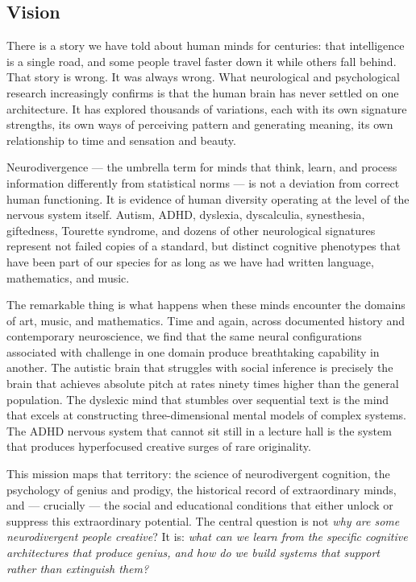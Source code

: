 \documentclass[11pt,letterpaper]{article}
\begin{document}
\subsection{Vision}

There is a story we have told about human minds for centuries: that intelligence is a single road, and some people travel faster down it while others fall behind. That story is wrong. It was always wrong. What neurological and psychological research increasingly confirms is that the human brain has never settled on one architecture. It has explored thousands of variations, each with its own signature strengths, its own ways of perceiving pattern and generating meaning, its own relationship to time and sensation and beauty.

Neurodivergence — the umbrella term for minds that think, learn, and process information differently from statistical norms — is not a deviation from correct human functioning. It is evidence of human diversity operating at the level of the nervous system itself. Autism, ADHD, dyslexia, dyscalculia, synesthesia, giftedness, Tourette syndrome, and dozens of other neurological signatures represent not failed copies of a standard, but distinct cognitive phenotypes that have been part of our species for as long as we have had written language, mathematics, and music.

The remarkable thing is what happens when these minds encounter the domains of art, music, and mathematics. Time and again, across documented history and contemporary neuroscience, we find that the same neural configurations associated with challenge in one domain produce breathtaking capability in another. The autistic brain that struggles with social inference is precisely the brain that achieves absolute pitch at rates ninety times higher than the general population. The dyslexic mind that stumbles over sequential text is the mind that excels at constructing three-dimensional mental models of complex systems. The ADHD nervous system that cannot sit still in a lecture hall is the system that produces hyperfocused creative surges of rare originality.

This mission maps that territory: the science of neurodivergent cognition, the psychology of genius and prodigy, the historical record of extraordinary minds, and — crucially — the social and educational conditions that either unlock or suppress this extraordinary potential. The central question is not \textit{why are some neurodivergent people creative}? It is: \textit{what can we learn from the specific cognitive architectures that produce genius, and how do we build systems that support rather than extinguish them?}
\end{document}

